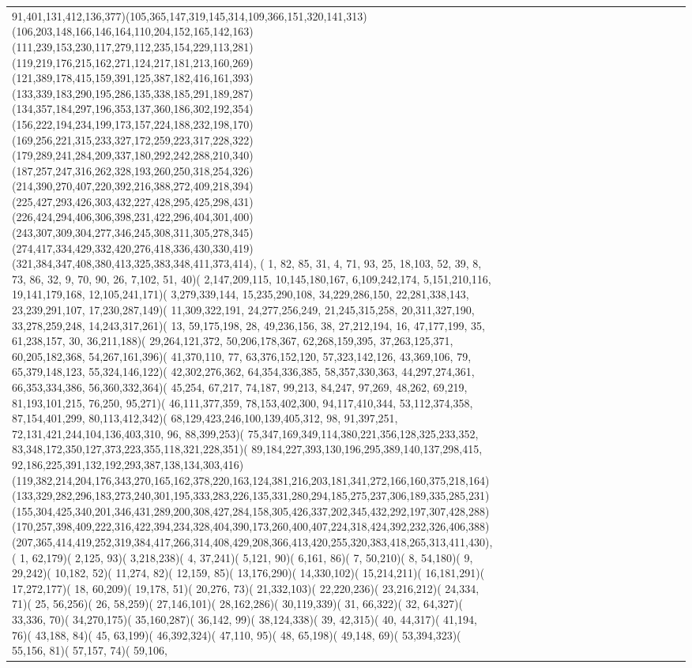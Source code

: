 \documentclass[varwidth=\maxdimen,border=10]{standalone}
\begin{document}
\begin{tabular}{@{}l@{}l@{}l@{}l@{}l@{}l@{}l@{}l@{}l@{}l@{}l@{}l@{}l@{}l@{}l@{}l@{}l@{}l@{}}
91,401,131,412,136,377)(105,365,147,319,145,314,109,366,151,320,141,313)(106,203,148,166,146,164,110,204,152,165,142,163)(111,239,153,230,117,279,112,235,154,229,113,281)(119,219,176,215,162,271,124,217,181,213,160,269)(121,389,178,415,159,391,125,387,182,416,161,393)(133,339,183,290,195,286,135,338,185,291,189,287)(134,357,184,297,196,353,137,360,186,302,192,354)(156,222,194,234,199,173,157,224,188,232,198,170)(169,256,221,315,233,327,172,259,223,317,228,322)(179,289,241,284,209,337,180,292,242,288,210,340)(187,257,247,316,262,328,193,260,250,318,254,326)(214,390,270,407,220,392,216,388,272,409,218,394)(225,427,293,426,303,432,227,428,295,425,298,431)(226,424,294,406,306,398,231,422,296,404,301,400)(243,307,309,304,277,346,245,308,311,305,278,345)(274,417,334,429,332,420,276,418,336,430,330,419)(321,384,347,408,380,413,325,383,348,411,373,414), (  1, 82, 85, 31,  4, 71, 93, 25, 18,103, 52, 39,  8, 73, 86, 32,  9, 70, 90, 26,  7,102, 51, 40)(  2,147,209,115, 10,145,180,167,  6,109,242,174,  5,151,210,116, 19,141,179,168, 12,105,241,171)(  3,279,339,144, 15,235,290,108, 34,229,286,150, 22,281,338,143, 23,239,291,107, 17,230,287,149)( 11,309,322,191, 24,277,256,249, 21,245,315,258, 20,311,327,190, 33,278,259,248, 14,243,317,261)( 13, 59,175,198, 28, 49,236,156, 38, 27,212,194, 16, 47,177,199, 35, 61,238,157, 30, 36,211,188)( 29,264,121,372, 50,206,178,367, 62,268,159,395, 37,263,125,371, 60,205,182,368, 54,267,161,396)( 41,370,110, 77, 63,376,152,120, 57,323,142,126, 43,369,106, 79, 65,379,148,123, 55,324,146,122)( 42,302,276,362, 64,354,336,385, 58,357,330,363, 44,297,274,361, 66,353,334,386, 56,360,332,364)( 45,254, 67,217, 74,187, 99,213, 84,247, 97,269, 48,262, 69,219, 81,193,101,215, 76,250, 95,271)( 46,111,377,359, 78,153,402,300, 94,117,410,344, 53,112,374,358, 87,154,401,299, 80,113,412,342)( 68,129,423,246,100,139,405,312, 98, 91,397,251, 72,131,421,244,104,136,403,310, 96, 88,399,253)( 75,347,169,349,114,380,221,356,128,325,233,352, 83,348,172,350,127,373,223,355,118,321,228,351)( 89,184,227,393,130,196,295,389,140,137,298,415, 92,186,225,391,132,192,293,387,138,134,303,416)(119,382,214,204,176,343,270,165,162,378,220,163,124,381,216,203,181,341,272,166,160,375,218,164)(133,329,282,296,183,273,240,301,195,333,283,226,135,331,280,294,185,275,237,306,189,335,285,231)(155,304,425,340,201,346,431,289,200,308,427,284,158,305,426,337,202,345,432,292,197,307,428,288)(170,257,398,409,222,316,422,394,234,328,404,390,173,260,400,407,224,318,424,392,232,326,406,388)(207,365,414,419,252,319,384,417,266,314,408,429,208,366,413,420,255,320,383,418,265,313,411,430), (  1, 62,179)(  2,125, 93)(  3,218,238)(  4, 37,241)(  5,121, 90)(  6,161, 86)(  7, 50,210)(  8, 54,180)(  9, 29,242)( 10,182, 52)( 11,274, 82)( 12,159, 85)( 13,176,290)( 14,330,102)( 15,214,211)( 16,181,291)( 17,272,177)( 18, 60,209)( 19,178, 51)( 20,276, 73)( 21,332,103)( 22,220,236)( 23,216,212)( 24,334, 71)( 25, 56,256)( 26, 58,259)( 27,146,101)( 28,162,286)( 30,119,339)( 31, 66,322)( 32, 64,327)( 33,336, 70)( 34,270,175)( 35,160,287)( 36,142, 99)( 38,124,338)( 39, 42,315)( 40, 44,317)( 41,194, 76)( 43,188, 84)( 45, 63,199)( 46,392,324)( 47,110, 95)( 48, 65,198)( 49,148, 69)( 53,394,323)( 55,156, 81)( 57,157, 74)( 59,106, 
\end{tabular}
\end{document}
